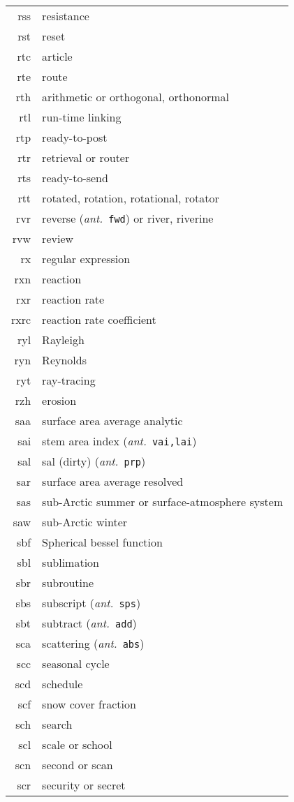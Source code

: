 \documentclass[12pt,twoside]{article}
\newcommand{\ant}[1]{(\textit{ant.}~\texttt{#1})}
\begin{document}
\begin{longtable}[>{\bfseries}l]{>{\ttfamily}r l}
rss & resistance \\
rst & reset \\
rtc & article \\
rte & route \\
rth & arithmetic or orthogonal, orthonormal \\
rtl & run-time linking \\
rtp & ready-to-post \\
rtr & retrieval or router \\
rts & ready-to-send \\
rtt & rotated, rotation, rotational, rotator \\
rvr & reverse \ant{fwd} or river, riverine \\
rvw & review \\
rx & regular expression \\
rxn & reaction \\
rxr & reaction rate \\
rxrc & reaction rate coefficient \\
ryl & Rayleigh \\
ryn & Reynolds \\
ryt & ray-tracing \\
rzh & erosion \\
saa & surface area average analytic \\
sai & stem area index \ant{vai,lai} \\
sal & sal (dirty) \ant{prp} \\
sar & surface area average resolved \\
sas & sub-Arctic summer or surface-atmosphere system \\
saw & sub-Arctic winter \\
sbf & Spherical bessel function \\
sbl & sublimation \\
sbr & subroutine \\
sbs & subscript \ant{sps} \\
sbt & subtract \ant{add} \\
sca & scattering \ant{abs} \\
scc & seasonal cycle \\
scd & schedule \\
scf & snow cover fraction \\
sch & search \\
scl & scale or school \\
scn & second or scan \\
scr & security or secret \\

\end{longtable}
\end{document}
